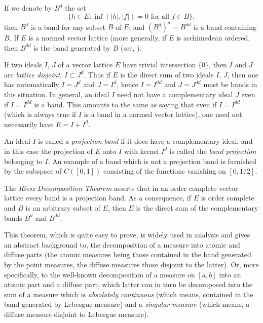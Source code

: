 If we denote by $ B^{d} $ the set 
\[
\{h \in E \colon \inf(|h|,|f|) = 0 \text{ for all $f \in B$}\},
\]
then $ B^{d} $ is a band for any subset $ B $ of\/ $ E $, and $ (B^{d})^{d} = B^{dd} $ is a band containing $ B $.
If\/ $ E $ is a normed vector lattice (more generally, if\/ $ E $ is archimedean ordered, then $ B^{dd} $ is the band generated by $ B $ (see, \eg \textcite{schaefer:1974}).

If two ideals $ I $,  $ J $ of a vector lattice $ E $ have trivial intersection $ \{0\} $, then $ I $ and $ J $ are \emph{lattice disjoint}, \ie $ I \subset J^{d} $.
Thus if\/ $ E $ is the direct sum of two ideals $ I $,  $ J $, then one has automatically $ I = J^{d} $ and $ J = I^{d} $, hence $ I = I^{dd} $ and $ J = J^{dd} $ must be bands in this situation.
In general, an ideal $ I $ need not have a complementary ideal $ J $ even if\/ $ I = I^{dd} $ is a band.
This amounts to the same as saying that even if\/ $ I = I^{dd} $ (which is always true if\/ $ I $ is a band in a normed vector lattice), one need not necessarily have $ E = I + I^{d} $.

An ideal $ I $ is called a \emph{projection band} if it does have a complementary ideal, and in this case the projection of\/ $ E $ onto $ I $ with kernel $ I^{d} $ is called the \emph{band projection} belonging to $ I $.
An example of a band which is not a projection band is furnished by the subspace of\/ $ C([0,1]) $ consisting of the functions vanishing on $ [0,1/2] $.

The \emph{Riesz Decomposition Theorem} asserts that in an order complete vector lattice every band is a projection band.
As a consequence, if\/ $ E $ is order complete and $ B $ is an arbitrary subset of\/ $ E $, then $ E $ is the direct sum of the complementary bands $ B^{d} $ and $ B^{dd} $.

This theorem, which is quite easy to prove, is widely used in analysis and gives an abstract background to, \eg the decomposition of a measure into atomic and diffuse parts (the atomic measures being those contained in the band generated by the point measures, the diffuse measures those disjoint to the latter). Or, more specifically, to the well-known decomposition of a measure on $ [a,b] $ into an atomic part and a diffuse part, which latter can in turn be decomposed into the sum of a measure which is \emph{absolutely continuous} (which means, contained in the band generated by Lebesgue measure) and a \emph{singular measure} (which means, a diffuse measure disjoint to Lebesgue measure).

